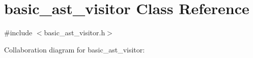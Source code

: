 \section{basic\+\_\+ast\+\_\+visitor Class Reference}
\label{classbasic__ast__visitor}


{\ttfamily \#include $<$basic\+\_\+ast\+\_\+visitor.\+h$>$}



Collaboration diagram for basic\+\_\+ast\+\_\+visitor\+:
